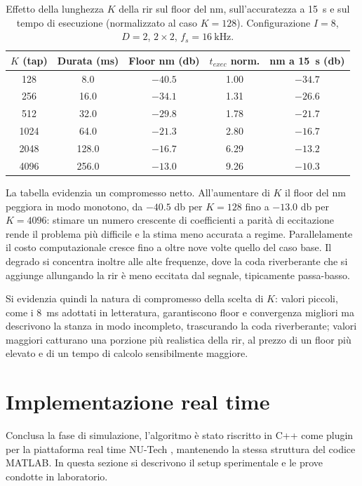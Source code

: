 \documentclass[11pt,a4paper]{article}
\begin{document}
	\begin{table}[H]
		\centering
		\begin{tabular}{ccccc}
			\hline
			$K$ (tap) & Durata (\si{\milli\second}) & Floor \ac{nm} (\si{\decibel}) & $t_{exec}$ norm. & \ac{nm} a \SI{15}{\second} (\si{\decibel}) \\
			\hline
			128  & 8.0   & $-40.5$ & 1.00 & $-34.7$ \\
			256  & 16.0  & $-34.1$ & 1.31 & $-26.6$ \\
			512  & 32.0  & $-29.8$ & 1.78 & $-21.7$ \\
			1024 & 64.0  & $-21.3$ & 2.80 & $-16.7$ \\
			2048 & 128.0 & $-16.7$ & 6.29 & $-13.2$ \\
			4096 & 256.0 & $-13.0$ & 9.26 & $-10.3$ \\
			\hline
		\end{tabular}
		\caption{Effetto della lunghezza $K$ della \ac{rir} sul floor del \ac{nm}, sull'accuratezza a \SI{15}{\second} e sul tempo di esecuzione (normalizzato al caso $K = 128$). Configurazione $I = 8$, $D = 2$, $2 \times 2$, $f_s = \SI{16}{\kilo\hertz}$.}
		\label{tab:rir_length}
	\end{table}
	
	La tabella evidenzia un compromesso netto. 
	All'aumentare di $K$ il floor del \ac{nm} peggiora in modo monotono, da $-40.5$ \si{\decibel} per $K = 128$ fino a $- 13.0$ \si{\decibel} per $K = 4096$: stimare un numero crescente di coefficienti a parità di eccitazione rende il problema più difficile e la stima meno accurata a regime.
	Parallelamente il costo computazionale cresce fino a oltre nove volte quello del caso base.
	Il degrado si concentra inoltre alle alte frequenze, dove la coda riverberante che si aggiunge allungando la \ac{rir} è meno eccitata dal segnale, tipicamente passa-basso.
	
	Si evidenzia quindi la natura di compromesso della scelta di $K$: valori piccoli, come i \SI{8}{\milli\second} adottati in letteratura, garantiscono floor e convergenza migliori ma descrivono la stanza in modo incompleto, trascurando la coda riverberante; valori maggiori catturano una porzione più realistica della \ac{rir}, al prezzo di un floor più elevato e di un tempo di calcolo sensibilmente maggiore.
	
	\newpage
	\section{Implementazione real time}
	Conclusa la fase di simulazione, l'algoritmo è stato riscritto in C++ come plugin per la piattaforma real time NU-Tech \cite{nutech}, mantenendo la stessa struttura del codice MATLAB.
	In questa sezione si descrivono il setup sperimentale e le prove condotte in laboratorio.
\end{document}
